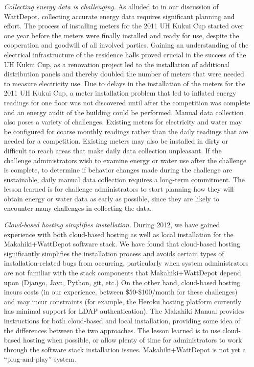 {\em Collecting energy data is challenging.} As alluded to in our discussion of WattDepot, collecting accurate energy data requires significant planning and effort. The process of installing meters for the 2011 UH Kukui Cup started over one year before the meters were finally installed and ready for use, despite the cooperation and goodwill of all involved parties. Gaining an understanding of the electrical infrastructure of the residence halls proved crucial in the success of the UH Kukui Cup, as a renovation project led to the installation of additional distribution panels and thereby doubled the number of meters that were needed to measure electricity use. Due to delays in the installation of the meters for the 2011 UH Kukui Cup, a meter installation problem that led to inflated energy readings for one floor was not discovered until after the competition was complete and an energy audit of the building could be performed. Manual data collection also poses a variety of challenges. Existing meters for electricity and water may be configured for coarse monthly readings rather than the daily readings that are needed for a competition. Existing meters may also be installed in dirty or difficult to reach areas that make daily data collection unpleasant. If the challenge administrators wish to examine energy or water use after the challenge is complete, to determine if behavior changes made during the challenge are sustainable, daily manual data collection requires a long-term commitment. The lesson learned is for challenge administrators to start planning how they will obtain energy or water data as early as possible, since they are likely to encounter many challenges in collecting the data.

{\em Cloud-based hosting simplifies installation.}  During 2012, we have gained experience with both cloud-based hosting as well as local installation for the Makahiki+WattDepot software stack.  We have found that cloud-based hosting significantly simplifies the installation process and avoids certain types of installation-related bugs from occurring, particularly when system administrators are not familiar with the stack components that Makahiki+WattDepot depend upon (Django, Java, Python, git, etc.)  On the other hand, cloud-based hosting incurs costs (in our experience, between \$50-\$100/month for these challenges) and may incur constraints (for example, the Heroku hosting platform currently has minimal support for LDAP authentication).  The Makahiki Manual \cite{MakahikiManual} provides instructions for both cloud-based and local installation, providing some idea of the differences between the two approaches.  The lesson learned is to use cloud-based hosting when possible, or allow plenty of time for administrators to work through the software stack installation issues. Makahiki+WattDepot is not yet a ``plug-and-play'' system.

